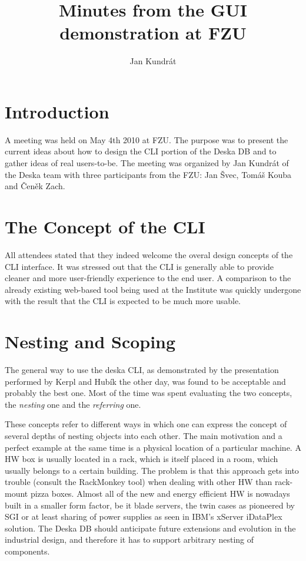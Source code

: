 \documentclass[12pt]{article}
\author{Jan Kundrát}
\title{Minutes from the GUI demonstration at FZU}
\begin{document}
\maketitle

\section{Introduction}

A meeting was held on May 4th 2010 at FZU.  The purpose was to present the
current ideas about how to design the CLI portion of the Deska DB and to gather
ideas of real users-to-be.  The meeting was organized by Jan Kundrát of the
Deska team with three participants from the FZU: Jan Švec, Tomáš Kouba and Čeněk
Zach.

\section{The Concept of the CLI}

All attendees stated that they indeed welcome the overal design concepts of the
CLI interface.  It was stressed out that the CLI is generally able to provide
cleaner and more user-friendly experience to the end user.  A comparison to the
already existing web-based tool being used at the Institute was quickly
undergone with the result that the CLI is expected to be much more usable.

\section{Nesting and Scoping}

The general way to use the deska CLI, as demonstrated by the presentation
performed by Kerpl and Hubík the other day, was found to be acceptable and
probably the best one.  Most of the time was spent evaluating the two concepts,
the {\em nesting} one and the {\em referring} one.

These concepts refer to different ways in which one can express the concept of
several depths of nesting objects into each other.  The main motivation and a
perfect example at the same time is a physical location of a particular machine.
A HW box is usually located in a rack, which is itself placed in a room, which
usually belongs to a certain building.  The problem is that this approach gets
into trouble (consult the RackMonkey tool) when dealing with other HW than
rack-mount pizza boxes.  Almost all of the new and energy efficient HW is
nowadays built in a smaller form factor, be it blade servers, the twin
cases as pioneered by SGI or at least sharing of power supplies as seen in IBM's
xServer iDataPlex solution.  The Deska DB should anticipate future extensions
and evolution in the industrial design, and therefore it has to support
arbitrary nesting of components.
\end{document}
